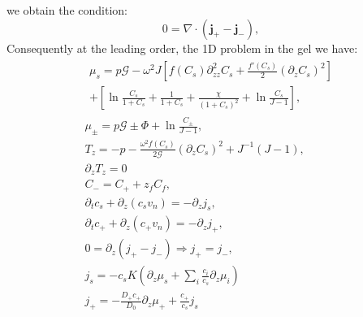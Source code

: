 \documentclass[12pt]{extarticle}
\begin{document}
we obtain the condition:
\begin{equation}
0= \nabla\cdot(\mathbf{j}_+-\mathbf{j}_-),
\end{equation}
Consequently at the leading order, the 1D problem in the gel we have:
\begin{gather}
\begin{aligned}
\mu_s = p \mathcal{G}  - \omega^2 J \left[f(C_s)\partial_{zz}^2 C_s+\frac{f'(C_s)}{2}\left(\partial_z C_s\right)^2\right]\\
+ \left[\ln \frac{C_s}{1+C_s} + \frac{1}{1+C_s}+\frac{\chi}{(1+C_s)^2} + \ln \frac{C_s}{J-1} \right], 
\end{aligned}\\[2.5mm]
\mu_\pm = p \mathcal{G} \pm \Phi + \ln \frac{C_\pm}{J-1} ,\\
T_z= -p -\frac{\omega^2 f(C_s)}{2\mathcal{G}} (\partial_z C_s)^2+ J^{-1}\left(J-1\right),\\
\partial_z T_z=0\\
C_- = C_+ + z_f C_f,\\
\partial_t c_s + \partial_z (c_s v_n)=- \partial_z j_s,\\
\partial_t c_+ +\partial_z (c_+ v_n)= -\partial_zj_+,\\
0= \partial_z(j_+-j_-) \Rightarrow j_+=j_-,\\
j_s =-c_sK  \left(\partial_z\mu_s +\sum_i \frac{c_i}{c_s} \partial_z \mu_i\right)\\
j_+= - \frac{D_+ c_+}{D_0}\partial_z \mu_+ + \frac{c_+}{c_s}j_s
\end{gather}
\end{document}
